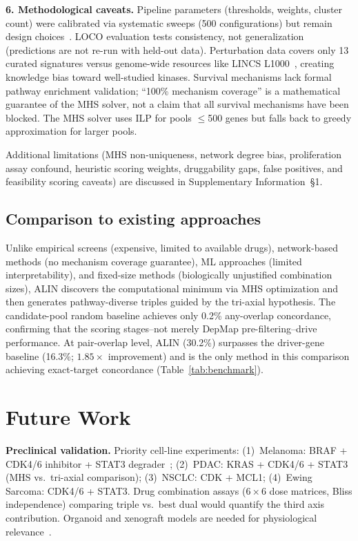 \documentclass[11pt]{article}
\begin{document}
\textbf{6. Methodological caveats.} Pipeline parameters (thresholds, weights, cluster count) were calibrated via systematic sweeps (500 configurations) but remain design choices~\cite{Dempster2021,Behan2019}. LOCO evaluation tests consistency, not generalization (predictions are not re-run with held-out data). Perturbation data covers only 13 curated signatures versus genome-wide resources like LINCS L1000~\cite{Subramanian2017}, creating knowledge bias toward well-studied kinases. Survival mechanisms lack formal pathway enrichment validation; ``100\% mechanism coverage'' is a mathematical guarantee of the MHS solver, not a claim that all survival mechanisms have been blocked. The MHS solver uses ILP for pools $\leq$500 genes but falls back to greedy approximation for larger pools.

Additional limitations (MHS non-uniqueness, network degree bias, proliferation assay confound, heuristic scoring weights, druggability gaps, false positives, and feasibility scoring caveats) are discussed in Supplementary Information~\S1.

\subsection*{Comparison to existing approaches}
Unlike empirical screens (expensive, limited to available drugs), network-based methods (no mechanism coverage guarantee), ML approaches (limited interpretability), and fixed-size methods (biologically unjustified combination sizes), ALIN discovers the computational minimum via MHS optimization and then generates pathway-diverse triples guided by the tri-axial hypothesis. The candidate-pool random baseline achieves only 0.2\% any-overlap concordance, confirming that the scoring stages--not merely DepMap pre-filtering--drive performance. At pair-overlap level, ALIN (30.2\%) surpasses the driver-gene baseline (16.3\%; $1.85\times$ improvement) and is the only method in this comparison achieving exact-target concordance (Table~\ref{tab:benchmark}).

\section*{Future Work}

\textbf{Preclinical validation.} Priority cell-line experiments: (1)~Melanoma: BRAF + CDK4/6 inhibitor + STAT3 degrader~\cite{Bai2019}; (2)~PDAC: KRAS + CDK4/6 + STAT3 (MHS vs.\ tri-axial comparison); (3)~NSCLC: CDK + MCL1; (4)~Ewing Sarcoma: CDK4/6 + STAT3. Drug combination assays ($6 \times 6$ dose matrices, Bliss independence) comparing triple vs.\ best dual would quantify the third axis contribution. Organoid and xenograft models are needed for physiological relevance~\cite{BenDavid2018}.
\end{document}
